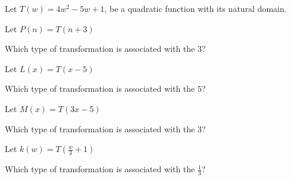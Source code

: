 \documentclass{ximera}
\author{Lee Wayand}
\begin{document}
\begin{exercise}




Let $T(w) = 4 w^2 - 5 w + 1$, be a quadratic function with its natural domain. \\


\begin{question}


Let $P(n) = T(n + 3)$


Which type of transformation is associated with the $3$?


\begin{multipleChoice}
\end{multipleChoice}


\end{question}







\begin{question}


Let $L(x) = T(x - 5)$


Which type of transformation is associated with the $5$?


\begin{multipleChoice}
\end{multipleChoice}


\end{question}











\begin{question}


Let $M(x) = T(3x - 5)$


Which type of transformation is associated with the $3$?


\begin{multipleChoice}
\end{multipleChoice}


\end{question}










\begin{question}


Let $k(w) = T\left( \frac{w}{3} + 1 \right)$


Which type of transformation is associated with the $\frac{1}{3}$?


\begin{multipleChoice}
\end{multipleChoice}


\end{question}








\end{exercise}
\end{document}
